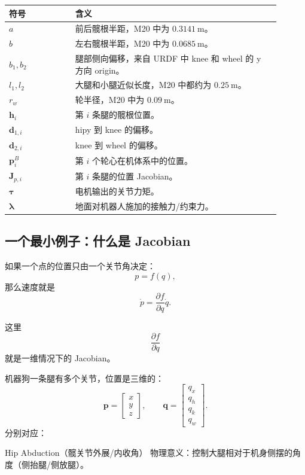 \documentclass[UTF8,11pt,a4paper]{ctexart}
\newcommand{\bs}[1]{\bm{#1}}
\begin{document}
\begin{center}
\begin{tabular}{p{0.22\linewidth}p{0.68\linewidth}}
\toprule
符号 & 含义 \\
\midrule
\(a\) & 前后髋根半距，M20 中为 \(0.3141\ \mathrm m\)。\\
\(b\) & 左右髋根半距，M20 中为 \(0.0685\ \mathrm m\)。\\
\(b_1,b_2\) & 腿部侧向偏移，来自 URDF 中 knee 和 wheel 的 y 方向 origin。\\
\(l_1,l_2\) & 大腿和小腿近似长度，M20 中都约为 \(0.25\ \mathrm m\)。\\
\(r_w\) & 轮半径，M20 中为 \(0.09\ \mathrm m\)。\\
\(\bs h_i\) & 第 \(i\) 条腿的髋根位置。\\
\(\bs d_{1,i}\) & hipy 到 knee 的偏移。\\
\(\bs d_{2,i}\) & knee 到 wheel 的偏移。\\
\(\bs p_i^B\) & 第 \(i\) 个轮心在机体系中的位置。\\
\(\bs J_{p,i}\) & 第 \(i\) 条腿的位置 Jacobian。\\
\(\bs \tau\) & 电机输出的关节力矩。\\
\(\bs \lambda\) & 地面对机器人施加的接触力/约束力。\\
\bottomrule
\end{tabular}
\end{center}

\subsection{一个最小例子：什么是 Jacobian}

如果一个点的位置只由一个关节角决定：
\[
p=f(q),
\]
那么速度就是
\[
\dot p =
\frac{\partial f}{\partial q}\dot q.
\]

这里
\[
\frac{\partial f}{\partial q}
\]
就是一维情况下的 Jacobian。

机器狗一条腿有多个关节，位置是三维的：
\[
\bs p =
\begin{bmatrix}
x\\y\\z
\end{bmatrix},
\qquad
\bs q =
\begin{bmatrix}
q_x\\q_h\\q_k\\q_w           
\end{bmatrix}.
\]
分别对应：

Hip Abduction（髋关节外展/内收角）
物理意义：控制大腿相对于机身侧摆的角度（侧抬腿/侧放腿）。
\end{document}
